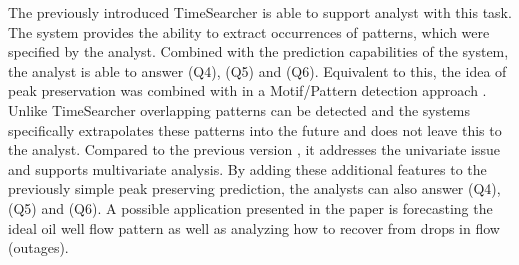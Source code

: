 \documentclass[electronic]{vgtc}             %
\begin{document}
The previously introduced TimeSearcher \cite{Hochheiser:2004, buono:2005, buono:2007} is able to support analyst with this task.
The system provides the ability to extract occurrences of patterns, which were specified by the analyst. 
Combined with the prediction capabilities of the system, the analyst is able to answer (Q4), (Q5) and (Q6).
Equivalent to this, the idea of peak preservation \cite{Hao:2009, Hao:2011} was combined with in a Motif/Pattern detection approach \cite{Hao:2012}.
Unlike TimeSearcher \cite{Hochheiser:2004, buono:2005, buono:2007} overlapping patterns can be detected and the systems specifically extrapolates these patterns into the future and does not leave this to the analyst.
Compared to the previous version \cite{Hao:2009, Hao:2011}, it addresses the univariate issue and supports multivariate analysis. 
By adding these additional features to the previously simple peak preserving prediction, the analysts can also answer (Q4), (Q5) and (Q6). 
A possible application presented in the paper is forecasting the ideal oil well flow pattern as well as analyzing how to recover from drops in flow (outages).   
\end{document}
